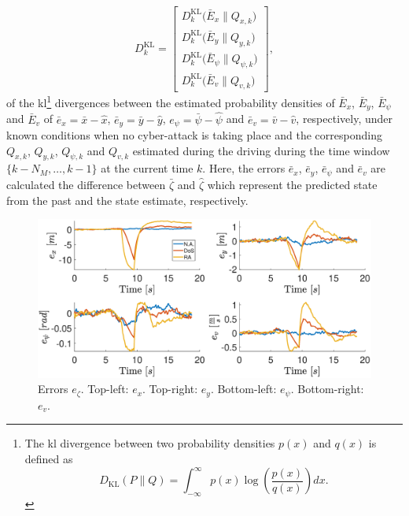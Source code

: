 \begin{equation}\label{eq:kl_div}
	D^{\mathrm{KL}}_k =%
	\begin{bmatrix}
		D^{\mathrm{KL}}_k\big(\bar{E}_x \| Q_{x,k}\big)\\
		D^{\mathrm{KL}}_k\big(\bar{E}_y \| Q_{y,k}\big)\\
		D^{\mathrm{KL}}_k\big(\bar{E}_\psi \| Q_{\psi,k}\big)\\
		D^{\mathrm{KL}}_k\big(\bar{E}_v \| Q_{v,k}\big)
	\end{bmatrix},
\end{equation}
of the \gls{kl}\footnote{The \gls{kl} divergence between two probability densities $p(x)$ and $q(x)$ is defined as \begin{equation*}D_{\mathrm{KL}}(P \| Q)=\int_{-\infty}^{\infty} p(x) \log \left(\frac{p(x)}{q(x)}\right) dx.    \end{equation*}}
divergences between the estimated probability densities of $\bar E_x$, $\bar E_y$, $\bar E_\psi$ and $\bar E_v$ of $\bar e_x=\bar x - \hat x $, $\bar e_y=\bar y - \hat y$, $e_\psi =\bar \psi - \hat \psi$ and $\bar e_v=\bar v - \hat v$, respectively, under known conditions when no cyber-attack is taking place and the corresponding $Q_{x,k}$, $Q_{y,k}$, $Q_{\psi,k}$ and $Q_{v,k}$ estimated during the driving during the time window \mbox{$\big\{k-N_M,\ldots,k-1\big\}$} at the current time $k$. Here, the errors $\bar e_x$, $\bar e_y$, $\bar e_\psi$ and $\bar e_v$ are calculated the difference between $\bar \zeta$ and $\hat \zeta$ which represent the predicted state from the past and the state estimate, respectively.

\begin{figure}
	\centering
	\includegraphics[scale=0.4]{figure/Part2/Chapter6/Figures/Errors_All.eps}
	\caption{Errors $e_{\zeta}$. Top-left: $e_x$. Top-right: $e_y$. Bottom-left: $e_{\psi}$. Bottom-right: $e_v$.  }
	\label{fig:gamma_error}
\end{figure}

